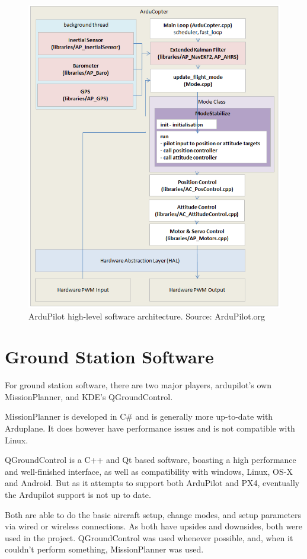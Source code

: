 \begin{figure}[h]
\centering
  \includegraphics[width=0.8\linewidth]{figs/copter-architecture.png}
  \caption{ArduPilot high-level software architecture. Source: ArduPilot.org}
  \label{fig:lowlevel}
\end{figure}


\section{Ground Station Software}

For ground station software, there are two major players, ardupilot's own MissionPlanner, and KDE's QGroundControl.

MissionPlanner is developed in C\# and is generally more up-to-date with Arduplane.
%
It does however have performance issues and is not compatible with Linux.
%

QGroundControl is a C++ and Qt based software, boasting a high performance and well-finished interface, as well as compatibility with windows, Linux, OS-X and Android. But as it attempts to support both ArduPilot and PX4, eventually the Ardupilot support is not up to date.
%

Both are able to do the basic aircraft setup, change modes, and setup parameters via wired or wireless connections. As both have upsides and downsides, both were used in the project. QGroundControl was used whenever possible, and, when it couldn't perform something, MissionPlanner was used.


